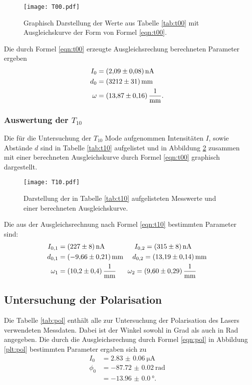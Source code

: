 
\FloatBarrier

\begin{figure}[htb]
  \centering
  \texttt{[image: T00.pdf]}
  \caption{Graphisch Darstellung der Werte aus Tabelle \ref{tab:t00} mit Ausgleichskurve der Form von Formel \ref{eqn:t00}.}
  \label{plt:t00}
\end{figure}
\FloatBarrier

Die durch Formel \ref{eqn:t00} erzeugte Ausgleichsrechung berechneten Parameter
ergeben
\begin{align*}
  I_0 &= \SI{2.09(8)}{\nano\ampere} \\
  d_0 &= \SI{3212(31)}{\milli\meter} \\
  \omega &= \SI{13.87(16)}{\raiseto{-1}\milli\meter}.
\end{align*}

\subsubsection{Auswertung der $T_{10}$}
Die für die Untersuchung der $T_{10}$ Mode aufgenommen Intensitäten $I$,
sowie Abstände $d$ sind in Tabelle \ref{tab:t10} aufgelistet und in
Abbildung \ref{plt:t10} zusammen mit einer berechneten Ausgleichskurve durch
Formel \ref{eqn:t00} graphisch dargestellt.


\FloatBarrier

\begin{figure}[htb]
  \centering
  \texttt{[image: T10.pdf]}
  \caption{Darstellung der in Tabelle \ref{tab:t10} aufgelisteten Messwerte und einer berechneten Ausgleichskurve.}
  \label{plt:t10}
\end{figure}
\FloatBarrier

Die aus der Ausgleichsrechnung nach Formel \ref{eqn:t10} bestimmten
Parameter sind:
\begin{align*}
  I_{0,1} &= \SI{227(8)}{\nano\ampere} \ \ \ \ \ \ \ \ \ \ \ \ \ I_{0,2} = \SI{315(8)}{\nano\ampere} \\
  d_{0,1} &= \SI{-9.66(21)}{\milli\meter} \ \ \ \ d_{0,2} = \SI{13.19(14)}{\milli\meter} \\
  \omega_1 &= \SI{10.2(4)}{\raiseto{-1}\milli\meter} \ \ \ \ \ \omega_2 = \SI{9.60(29)}{\raiseto{-1}\milli\meter}
\end{align*}

\subsection{Untersuchung der Polarisation}
Die Tabelle \ref{tab:pol} enthält alle zur Untersuchung der Polarisation
des Lasers verwendeten Messdaten. Dabei ist der Winkel sowohl in Grad als
auch in Rad angegeben.
Die durch die Ausgleichsrechung durch Formel \ref{eqn:pol} in Abbildung
\ref{plt:pol} bestimmten Parameter ergaben sich zu
\begin{align*}
  I_0 &= \SI{2.83(6)}{\micro\ampere} \\
  \phi_0 &= \SI{-87.72(2)}{\radian} \\
      &= \SI{-13.96(0)}{\degree}.
\end{align*}

